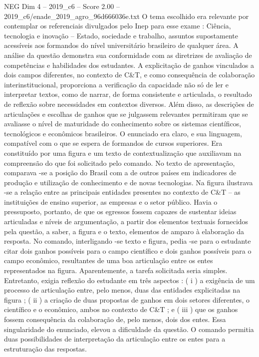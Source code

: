 \begin{textsample}{NEG Dim 4 – 2019\_c6 – Score 2.00 – 2019\_c6/enade\_2019\_agro\_96d666036e.txt}
O tema escolhido era relevante por contemplar os referenciais divulgados pelo Inep para esse exame : Ciência, tecnologia e inovação – Estado, sociedade e trabalho, assuntos supostamente acessíveis aos formandos do nível universitário brasileiro de qualquer área.
A análise da questão demonstra sua conformidade com as diretrizes de avaliação de competências e habilidades dos estudantes.
A explicitação de ganhos vinculados a dois campos diferentes, no contexto de C\&T, e como consequência de colaboração interinstitucional, proporciona a verificação da capacidade não só de ler e interpretar textos, como de narrar, de forma consistente e articulada, o resultado de reflexão sobre necessidades em contextos diversos.
Além disso, as descrições de articulações e escolhas de ganhos que se julgassem relevantes permitiram que se avaliasse o nível de maturidade do conhecimento sobre os sistemas científicos, tecnológicos e econômicos brasileiros.
O enunciado era claro, e sua linguagem, compatível com o que se espera de formandos de cursos superiores.
Era constituído por uma figura e um texto de contextualização que auxiliavam na compreensão do que foi solicitado pelo comando.
No texto de apresentação, comparava -se a posição do Brasil com a de outros países em indicadores de produção e utilização de conhecimento e de novas tecnologias.
Na figura ilustrava -se a relação entre as principais entidades presentes no contexto de C\&T – as instituições de ensino superior, as empresas e o setor público.
Havia o pressuposto, portanto, de que os egressos fossem capazes de sustentar ideias articuladas e níveis de argumentação, a partir dos elementos textuais fornecidos pela questão, a saber, a figura e o texto, elementos de amparo à elaboração da resposta.
No comando, interligando -se texto e figura, pedia -se para o estudante citar dois ganhos possíveis para o campo científico e dois ganhos possíveis para o campo econômico, resultantes de uma boa articulação entre os entes representados na figura.
Aparentemente, a tarefa solicitada seria simples.
Entretanto, exigia reflexão do estudante em três aspectos : ( i ) a exigência de um processo de articulação entre, pelo menos, duas das entidades explicitadas na figura ; ( ii ) a criação de duas propostas de ganhos em dois setores diferentes, o científico e o econômico, ambos no contexto de C\&T ; e ( iii ) que os ganhos fossem consequência da colaboração de, pelo menos, dois dos entes.
Essa singularidade do enunciado, elevou a dificuldade da questão.
O comando permitia duas possibilidades de interpretação da articulação entre os entes para a estruturação das respostas.

\end{textsample}
